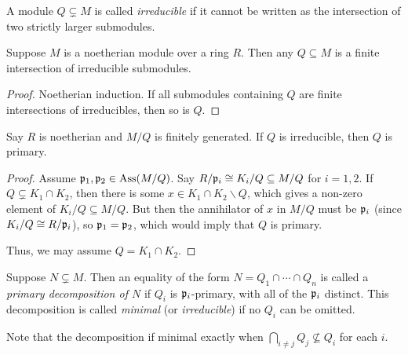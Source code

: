  \begin{definition}
   A module $Q\subsetneq M$ is called \emph{irreducible} if it cannot be written as the
   intersection of two strictly larger submodules.
 \end{definition}
 \begin{lemma}
   Suppose $M$ is a noetherian module over a ring $R$. Then any $Q\subseteq M$ is a
   finite intersection of irreducible submodules.
 \end{lemma}
 \begin{proof}
   Noetherian induction. If all submodules containing $Q$ are finite intersections of
   irreducibles, then so is $Q$.
 \end{proof}
 \begin{theorem}
   Say $R$ is noetherian and $M/Q$ is finitely generated. If $Q$ is irreducible, then $Q$
   is primary.
 \end{theorem}
 \begin{proof}
   Assume $\mathfrak{p}_1,\mathfrak{p}_2\in \operatorname{Ass} (M/Q)$. Say $R/\mathfrak{p}_i \cong K_i/Q \subseteq M/Q$ for $i=1,2$.
   If $Q\subsetneq K_1\cap K_2$, then there is some $x\in K_1\cap K_2\smallsetminus Q$,
   which gives a non-zero element of $K_i/Q\subseteq M/Q$. But then the annihilator of
   $x$ in $M/Q$ must be $\mathfrak{p}_i$ (since $K_i/Q\cong R/\mathfrak{p}_i$), so $\mathfrak{p}_1=\mathfrak{p}_2$, which would
   imply that $Q$ is primary.

   Thus, we may assume $Q=K_1\cap K_2$. 
 \end{proof}
 \begin{definition}
   Suppose $N\subsetneq M$. Then an equality of the form $N=Q_1\cap \cdots \cap Q_n$ is
   called a \emph{primary decomposition of $N$} if $Q_i$ is $\mathfrak{p}_i$-primary, with all of
   the $\mathfrak{p}_i$ distinct. This decomposition is called \emph{minimal} (or
   \emph{irreducible}) if no $Q_i$ can be omitted.
 \end{definition}
 Note that the decomposition if minimal exactly when $\bigcap_{i\neq j} Q_j\not\subseteq
 Q_i$ for each $i$.
